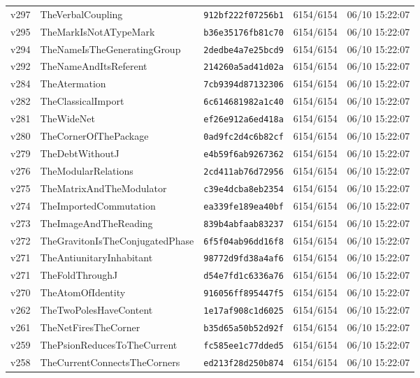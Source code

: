 \documentclass[11pt]{article}
\theoremstyle{definition}\newtheorem{deriv}{Derivação}
\begin{document}
{\begin{longtable}{@{}lllll@{}}
v297 & TheVerbalCoupling & \texttt{912bf222f07256b1} & 6154/6154 & 06/10 15:22:07 \\
v295 & TheMarkIsNotATypeMark & \texttt{b36e35176fb81c70} & 6154/6154 & 06/10 15:22:07 \\
v294 & TheNameIsTheGeneratingGroup & \texttt{2dedbe4a7e25bcd9} & 6154/6154 & 06/10 15:22:07 \\
v292 & TheNameAndItsReferent & \texttt{214260a5ad41d02a} & 6154/6154 & 06/10 15:22:07 \\
v284 & TheAtermation & \texttt{7cb9394d87132306} & 6154/6154 & 06/10 15:22:07 \\
v282 & TheClassicalImport & \texttt{6c614681982a1c40} & 6154/6154 & 06/10 15:22:07 \\
v281 & TheWideNet & \texttt{ef26e912a6ed418a} & 6154/6154 & 06/10 15:22:07 \\
v280 & TheCornerOfThePackage & \texttt{0ad9fc2d4c6b82cf} & 6154/6154 & 06/10 15:22:07 \\
v279 & TheDebtWithoutJ & \texttt{e4b59f6ab9267362} & 6154/6154 & 06/10 15:22:07 \\
v276 & TheModularRelations & \texttt{2cd411ab76d72956} & 6154/6154 & 06/10 15:22:07 \\
v275 & TheMatrixAndTheModulator & \texttt{c39e4dcba8eb2354} & 6154/6154 & 06/10 15:22:07 \\
v274 & TheImportedCommutation & \texttt{ea339fe189ea40bf} & 6154/6154 & 06/10 15:22:07 \\
v273 & TheImageAndTheReading & \texttt{839b4abfaab83237} & 6154/6154 & 06/10 15:22:07 \\
v272 & TheGravitonIsTheConjugatedPhase & \texttt{6f5f04ab96dd16f8} & 6154/6154 & 06/10 15:22:07 \\
v271 & TheAntiunitaryInhabitant & \texttt{98772d9fd38a4af6} & 6154/6154 & 06/10 15:22:07 \\
v271 & TheFoldThroughJ & \texttt{d54e7fd1c6336a76} & 6154/6154 & 06/10 15:22:07 \\
v270 & TheAtomOfIdentity & \texttt{916056ff895447f5} & 6154/6154 & 06/10 15:22:07 \\
v262 & TheTwoPolesHaveContent & \texttt{1e17af908c1d6025} & 6154/6154 & 06/10 15:22:07 \\
v261 & TheNetFiresTheCorner & \texttt{b35d65a50b52d92f} & 6154/6154 & 06/10 15:22:07 \\
v259 & ThePsionReducesToTheCurrent & \texttt{fc585ee1c77dded5} & 6154/6154 & 06/10 15:22:07 \\
v258 & TheCurrentConnectsTheCorners & \texttt{ed213f28d250b874} & 6154/6154 & 06/10 15:22:07 \\

\end{longtable}}
\end{document}
